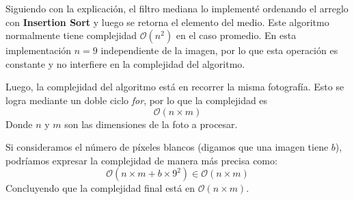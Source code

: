 \documentclass[11pt]{article}
\begin{document}
	
	Siguiendo con la explicación, el filtro mediana lo implementé ordenando el arreglo con \textbf{Insertion Sort} y luego se retorna el elemento del medio. Este algoritmo normalmente tiene complejidad $\mathcal{O}(n^2)$ en el caso promedio. En esta implementación $n = 9$ independiente de la imagen, por lo que esta operación es constante y no interfiere en la complejidad del algoritmo.
	
	Luego, la complejidad del algoritmo está en recorrer la misma fotografía. Esto se logra mediante un doble ciclo \textit{for}, por lo que la complejidad es $$\mathcal{O}(n\times m)$$ Donde $n$ y $m$ son las dimensiones de la foto a procesar.
	
	Si consideramos el número de píxeles blancos (digamos que una imagen tiene $b$), podríamos expresar la complejidad de manera más precisa como: $$\mathcal{O}(n\times m + b\times9^2)\in\mathcal{O}(n\times m)$$ Concluyendo que la complejidad final está en $\mathcal{O}(n\times m)$.
	
	
		
	
\end{document}
